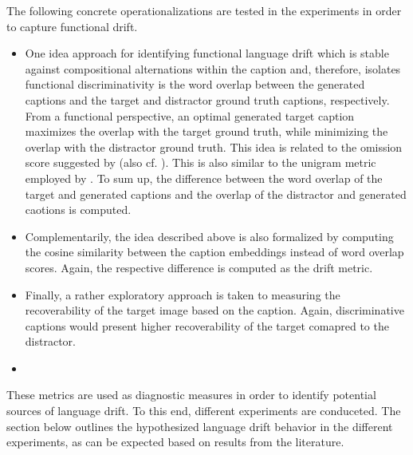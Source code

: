 The following concrete operationalizations are tested in the experiments in order to capture functional drift. \begin{itemize}
	\item One idea approach for identifying functional language drift which is stable against compositional alternations within the caption and, therefore, isolates functional discriminativity is the word overlap between the generated captions and the target and distractor ground truth captions, respectively. From a functional perspective, an optimal generated target caption maximizes the overlap with the target ground truth, while minimizing the overlap with the distractor ground truth. This idea is related to the omission score suggested by \cite{havrylov2017emergence} (also cf. \cite{andreas2016reasoning, gunel2020supervised}). This is also similar to the unigram metric employed by \cite{lazaridou2020multi}. To sum up, the difference between the word overlap of the target and generated captions and the overlap of the distractor and generated caotions is computed.
	\item Complementarily, the idea described above is also formalized by computing the cosine similarity between the caption embeddings instead of word overlap scores. Again, the respective difference is computed as the drift metric.
	\item Finally, a rather exploratory approach is taken to measuring the recoverability of the target image based on the caption.  Again, discriminative captions would present higher recoverability of the target comapred to the distractor. 
	\item {}
\end{itemize}
These metrics are used as diagnostic measures in order to identify potential sources of language drift. To this end, different experiments are conduceted. The section below outlines the hypothesized language drift behavior in the different experiments, as can be expected based on results from the literature.

